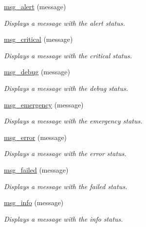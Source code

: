 \begin{DoxyCompactItemize}
\hyperlink{group__message_ga0b542f8978d859a6f0bd30de6791df41}{msg\+\_\+alert} (message)
\begin{DoxyCompactList}\small\item\em Displays a message with the \textquotesingle{}alert\textquotesingle{} status. \end{DoxyCompactList}\item 
\hyperlink{group__message_ga4f7002e0dcd96055ba404a5dd0ad34b1}{msg\+\_\+critical} (message)
\begin{DoxyCompactList}\small\item\em Displays a message with the \textquotesingle{}critical\textquotesingle{} status. \end{DoxyCompactList}\item 
\hyperlink{group__message_ga6a2070c37510d23ac294b0c007dde078}{msg\+\_\+debug} (message)
\begin{DoxyCompactList}\small\item\em Displays a message with the \textquotesingle{}debug\textquotesingle{} status. \end{DoxyCompactList}\item 
\hyperlink{group__message_ga3b4d3c652e7fdb3189a738a6cb1a99fd}{msg\+\_\+emergency} (message)
\begin{DoxyCompactList}\small\item\em Displays a message with the \textquotesingle{}emergency\textquotesingle{} status. \end{DoxyCompactList}\item 
\hyperlink{group__message_ga8fead3d7c844b6cfed0ca5ef0d930565}{msg\+\_\+error} (message)
\begin{DoxyCompactList}\small\item\em Displays a message with the \textquotesingle{}error\textquotesingle{} status. \end{DoxyCompactList}\item 
\hyperlink{group__message_ga1051f1ddca193760016f3021e885dfbb}{msg\+\_\+failed} (message)
\begin{DoxyCompactList}\small\item\em Displays a message with the \textquotesingle{}failed\textquotesingle{} status. \end{DoxyCompactList}\item 
\hyperlink{group__message_gad043c4df79f7cc2143ab6d3a67ea20da}{msg\+\_\+info} (message)
\begin{DoxyCompactList}\small\item\em Displays a message with the \textquotesingle{}info\textquotesingle{} status. \end{DoxyCompactList}\item 

\end{DoxyCompactItemize}
